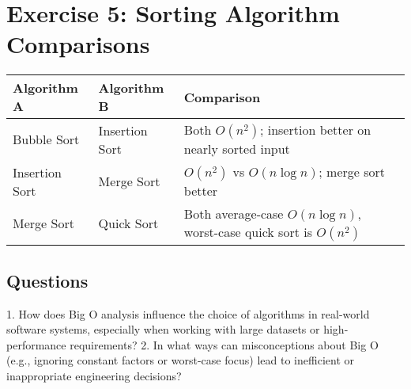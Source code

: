 \documentclass{article}
\begin{document}
\section*{Exercise 5: Sorting Algorithm Comparisons}
\begin{tabular}{|l|l|l|}
\hline
\textbf{Algorithm A} & \textbf{Algorithm B} & \textbf{Comparison} \\
\hline
Bubble Sort & Insertion Sort & Both \(O(n^2)\); insertion better on nearly sorted input \\
Insertion Sort & Merge Sort & \(O(n^2)\) vs \(O(n \log n)\); merge sort better \\
Merge Sort & Quick Sort & Both average-case \(O(n \log n)\), worst-case quick sort is \(O(n^2)\) \\
\hline
\end{tabular}
\subsection{Questions}
1.	How does Big O analysis influence the choice of algorithms in real-world software systems, especially when working with large datasets or high-performance requirements?
2.	In what ways can misconceptions about Big O (e.g., ignoring constant factors or worst-case focus) lead to inefficient or inappropriate engineering decisions?
\end{document}
